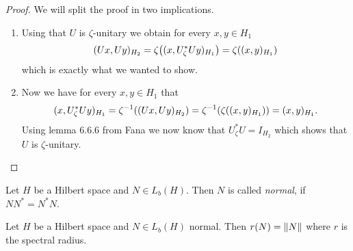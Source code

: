 \begin{proof}
	We will split the proof in two implications.
	\begin{enumerate}
		\item[\Quote{$(\mathrm{i}) \Rightarrow \ (\mathrm{ii})$}] Using that $U$ is $\zeta$-unitary we obtain for every $x,y \in H_1$ 
		\begin{align*}
			(Ux, Uy)_{H_2} = \zeta{\left ( (x, U_\zeta^\ast U y)_{H_1} \right )} = \zeta {\left ( (x,y)_{H_1} \right )}
		\end{align*}
		which is exactly what we wanted to show.
		
		\item[\Quote{$(\mathrm{ii}) \Rightarrow \ (\mathrm{i})$}] Now we have for every $x,y \in H_1$ that 
		\begin{align*}
			(x, U_\zeta^\ast U y)_{H_1} = \zeta^{-1}{\left ( (Ux, Uy)_{H_2} \right )} = \zeta^{-1}{\left ( \zeta{\left ( (x,y)_{H_1} \right )} \right )} = (x,y)_{H_1}.
		\end{align*}
		Using lemma 6.6.6 from Fana we now know that $U_\zeta^\ast U = I_{H_2}$ which shows that $U$ is $\zeta$-unitary.
	\end{enumerate}
\end{proof}

\begin{definition}
	Let $H$ be a Hilbert space and $N \in L_b(H)$. Then $N$ is called \textit{normal}, if $N N^\ast = N^\ast N$.
\end{definition}

\begin{proposition} \label{prop:spectral_radius}
	Let $H$ be a Hilbert space and $N \in L_b(H)$ normal. Then $r(N) = {\left \| N \right \|}_{}$ where $r$ is the spectral radius.
\end{proposition}